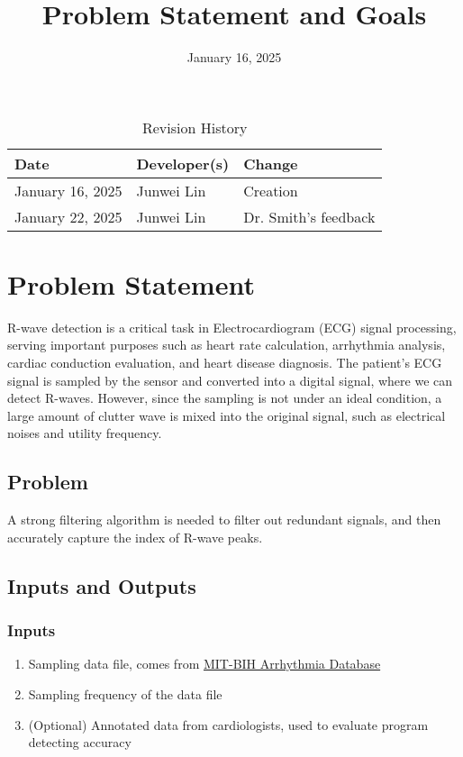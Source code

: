 \documentclass{article}
\title{Problem Statement and Goals\\\progname}
\author{\authname}
\date{January 16, 2025}
\begin{document}
\maketitle

\begin{table}[hp]
\caption{Revision History} \label{TblRevisionHistory}
\begin{tabularx}{\textwidth}{llX}
\toprule
\textbf{Date} & \textbf{Developer(s)} & \textbf{Change}\\
\midrule
January 16, 2025 & Junwei Lin & Creation\\
January 22, 2025 & Junwei Lin & Dr. Smith's feedback\\
\bottomrule
\end{tabularx}
\end{table}

\section{Problem Statement}

R-wave detection is a critical task in Electrocardiogram (ECG) signal processing, serving important purposes such as heart rate calculation, arrhythmia analysis, cardiac conduction evaluation, and heart disease diagnosis. The patient's ECG signal is sampled by the sensor and converted into a digital signal, where we can detect R-waves. However, since the sampling is not under an ideal condition, a large amount of clutter wave is mixed into the original signal, such as electrical noises and utility frequency.

\subsection{Problem}

A strong filtering algorithm is needed to filter out redundant signals, and then accurately capture the index of R-wave peaks.

\subsection{Inputs and Outputs}

\subsubsection{Inputs}

\begin{enumerate}
    \item Sampling data file, comes from \href{https://physionet.org/content/mitdb/1.0.0/} {MIT-BIH Arrhythmia Database}
    \item Sampling frequency of the data file
    \item (Optional) Annotated data from cardiologists, used to evaluate program detecting accuracy
\end{enumerate}
\end{document}
